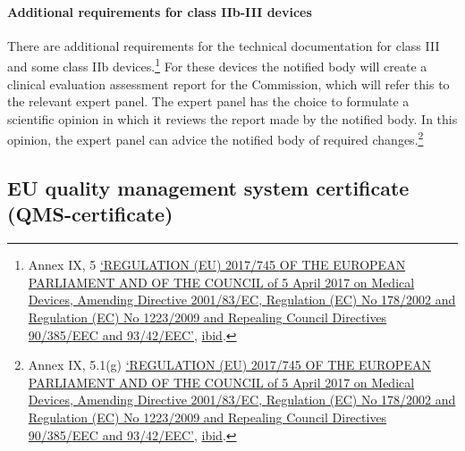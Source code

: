 \documentclass[
]{scrartcl}
\begin{document}
\hypertarget{additional-requirements-for-class-iib-iii-devices}{%
\paragraph{Additional requirements for class IIb-III devices}\label{additional-requirements-for-class-iib-iii-devices}}

There are additional requirements for the technical documentation for class III and some class IIb devices.\footnote{Annex IX, 5 \protect\hyperlink{ref-REGULATIONEU2017a}{{`{REGULATION} ({EU}) 2017/745 {OF THE EUROPEAN PARLIAMENT AND OF THE COUNCIL} of 5 {April} 2017 on Medical Devices, Amending {Directive} 2001/83/{EC}, {Regulation} ({EC}) {No} 178/2002 and {Regulation} ({EC}) {No} 1223/2009 and Repealing {Council Directives} 90/385/{EEC} and 93/42/{EEC}'}}, \protect\hyperlink{ref-REGULATIONEU2017a}{ibid}.} For these devices the notified body will create a clinical evaluation assessment report for the Commission, which will refer this to the relevant expert panel. The expert panel has the choice to formulate a scientific opinion in which it reviews the report made by the notified body. In this opinion, the expert panel can advice the notified body of required changes.\footnote{Annex IX, 5.1(g) \protect\hyperlink{ref-REGULATIONEU2017a}{{`{REGULATION} ({EU}) 2017/745 {OF THE EUROPEAN PARLIAMENT AND OF THE COUNCIL} of 5 {April} 2017 on Medical Devices, Amending {Directive} 2001/83/{EC}, {Regulation} ({EC}) {No} 178/2002 and {Regulation} ({EC}) {No} 1223/2009 and Repealing {Council Directives} 90/385/{EEC} and 93/42/{EEC}'}}, \protect\hyperlink{ref-REGULATIONEU2017a}{ibid}.}

\hypertarget{eu-quality-management-system-certificate-qms-certificate}{%
\subsection{EU quality management system certificate (QMS-certificate)}\label{eu-quality-management-system-certificate-qms-certificate}}
\end{document}
